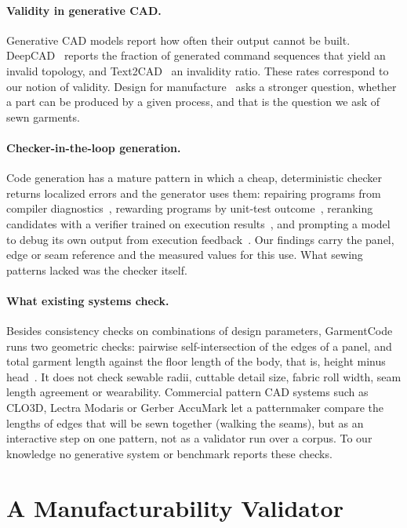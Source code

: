 \documentclass[10pt,twocolumn]{article}
\begin{document}
\paragraph{Validity in generative CAD.}
Generative CAD models report how often their output cannot be built.
DeepCAD~\citep{deepcad} reports the fraction of generated command sequences
that yield an invalid topology, and Text2CAD~\citep{text2cad} an invalidity
ratio. These rates correspond to our notion of validity. Design for
manufacture~\citep{boothroyd2010} asks a stronger question, whether a part can
be produced by a given process, and that is the question we ask of sewn
garments.

\paragraph{Checker-in-the-loop generation.}
Code generation has a mature pattern in which a cheap, deterministic checker
returns localized errors and the generator uses them: repairing programs from
compiler diagnostics~\citep{drrepair}, rewarding programs by unit-test
outcome~\citep{coderl}, reranking candidates with a verifier trained on
execution results~\citep{lever}, and prompting a model to debug its own output
from execution feedback~\citep{selfdebug}. Our findings carry the panel, edge
or seam reference and the measured values for this use. What sewing patterns
lacked was the checker itself.

\paragraph{What existing systems check.}
Besides consistency checks on combinations of design parameters, GarmentCode
runs two geometric checks: pairwise self-intersection of the edges of a panel,
and total garment length against the floor length of the body, that is, height
minus head~\citep{garmentcoderepo}. It does not check sewable radii, cuttable
detail size, fabric roll width, seam length agreement or wearability.
Commercial pattern CAD systems such as CLO3D, Lectra Modaris or Gerber
AccuMark let a patternmaker compare the lengths of edges that will be sewn
together (walking the seams), but as an interactive step on one pattern, not
as a validator run over a corpus. To our knowledge no generative system or
benchmark reports these checks.

\section{A Manufacturability Validator}
\label{sec:method}
\end{document}
